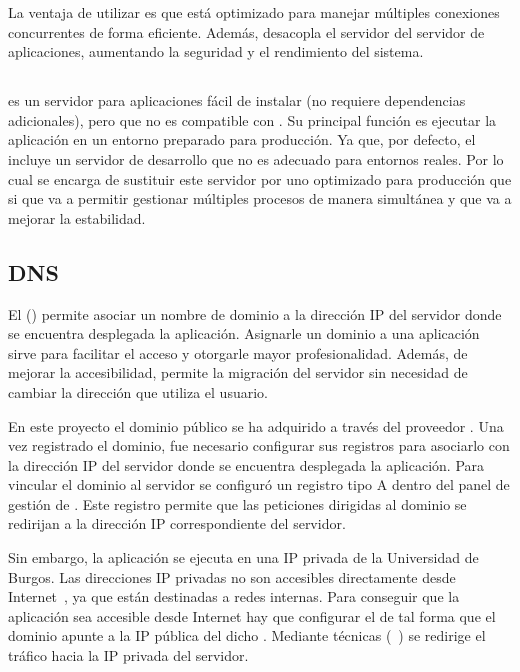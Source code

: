 La ventaja de utilizar  es que está optimizado para manejar múltiples conexiones concurrentes de forma eficiente. Además, desacopla el servidor  del servidor de aplicaciones, aumentando la seguridad y el rendimiento del sistema.

\subsection{}\label{gunicorn}
 es un servidor  para aplicaciones  fácil de instalar (no requiere dependencias adicionales), pero que no es compatible con . Su principal función es ejecutar la aplicación  en un entorno preparado para producción. Ya que, por defecto, el   incluye un servidor de desarrollo que no es adecuado para entornos reales. Por lo cual  se encarga de sustituir este servidor por uno optimizado para producción que si que va a permitir gestionar múltiples procesos de manera simultánea y que va a mejorar la estabilidad. 

\subsection{DNS}\label{dns}
El  () permite asociar un nombre de dominio a la dirección IP del servidor donde se encuentra desplegada la aplicación. Asignarle un dominio a una aplicación sirve para facilitar el acceso y otorgarle mayor profesionalidad. Además, de mejorar la accesibilidad, permite la migración del servidor sin necesidad de cambiar la dirección que utiliza el usuario.

En este proyecto el dominio público se ha adquirido a través del proveedor . Una vez registrado el dominio, fue necesario configurar sus registros  para asociarlo con la dirección IP del servidor donde se encuentra desplegada la aplicación. Para vincular el dominio al servidor se configuró un registro tipo A dentro del panel de gestión  de . Este registro permite que las peticiones dirigidas al dominio se redirijan a la dirección IP correspondiente del servidor.

Sin embargo, la aplicación se ejecuta en una IP privada de la Universidad de Burgos. Las direcciones IP privadas no son accesibles directamente desde Internet~\cite{ herramienta:ip_privadaVSpublica}, ya que están destinadas a redes internas. Para conseguir que la aplicación sea accesible desde Internet hay que configurar el  de tal forma que el dominio apunte a la IP pública del dicho . Mediante técnicas  (~\cite{herramienta:nat}) se redirige el tráfico hacia la IP privada del servidor. 

